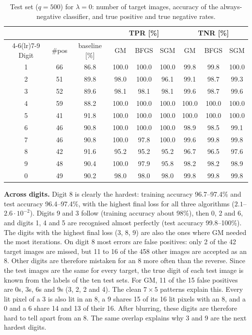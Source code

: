 \documentclass{article}
\begin{document}
\begin{table}[h]
\centering
\small
\setlength{\tabcolsep}{4pt}
\begin{tabular}{c cc ccc ccc}
\toprule
 & & & \multicolumn{3}{c}{TPR [\%]} & \multicolumn{3}{c}{TNR [\%]} \\
\cmidrule(lr){4-6}\cmidrule(lr){7-9}
Digit & \#pos & baseline [\%] & GM & BFGS & SGM & GM & BFGS & SGM \\
\midrule
1 & 66 & 86.8 & 100.0 & 100.0 & 100.0 & 99.8 & 99.8 & 100.0 \\
2 & 51 & 89.8 & 98.0 & 100.0 & 96.1 & 99.1 & 98.7 & 99.3 \\
3 & 52 & 89.6 & 98.1 & 98.1 & 98.1 & 99.6 & 98.7 & 99.6 \\
4 & 59 & 88.2 & 100.0 & 100.0 & 100.0 & 100.0 & 100.0 & 100.0 \\
5 & 41 & 91.8 & 100.0 & 100.0 & 100.0 & 100.0 & 100.0 & 100.0 \\
6 & 46 & 90.8 & 100.0 & 100.0 & 100.0 & 98.9 & 98.5 & 99.1 \\
7 & 46 & 90.8 & 100.0 & 97.8 & 100.0 & 99.6 & 99.8 & 99.8 \\
8 & 42 & 91.6 & 95.2 & 95.2 & 95.2 & 96.7 & 96.5 & 97.6 \\
9 & 48 & 90.4 & 100.0 & 97.9 & 95.8 & 98.2 & 98.2 & 98.9 \\
0 & 49 & 90.2 & 98.0 & 98.0 & 98.0 & 99.8 & 99.8 & 99.8 \\
\bottomrule
\end{tabular}
\caption{Test set ($q=500$) for $\lambda=0$: number of target images, accuracy of the always-negative classifier, and true positive and true negative rates.}
\label{tab:tprtnr}
\end{table}

\textbf{Across digits.} Digit 8 is clearly the hardest: training accuracy 96.7--97.4\% and test accuracy 96.4--97.4\%, with the highest final loss for all three algorithms ($2.1$--$2.6\cdot10^{-2}$). Digits 9 and 3 follow (training accuracy about 98\%), then 0, 2 and 6, and digits 1, 4 and 5 are recognised almost perfectly (test accuracy 99.8--100\%). The digits with the highest final loss (3, 8, 9) are also the ones where GM needed the most iterations. On digit 8 most errors are false positives: only 2 of the 42 target images are missed, but 11 to 16 of the 458 other images are accepted as an 8. Other digits are therefore mistaken for an 8 more often than the reverse. Since the test images are the same for every target, the true digit of each test image is known from the labels of the ten test sets. For GM, 11 of the 15 false positives are 0s, 3s, 6s and 9s (3, 2, 2 and 4). The clean $7\times5$ patterns explain this. Every lit pixel of a 3 is also lit in an 8, a 9 shares 15 of its 16 lit pixels with an 8, and a 0 and a 6 share 14 and 13 of their 16. After blurring, these digits are therefore hard to tell apart from an 8. The same overlap explains why 3 and 9 are the next hardest digits.
\end{document}

